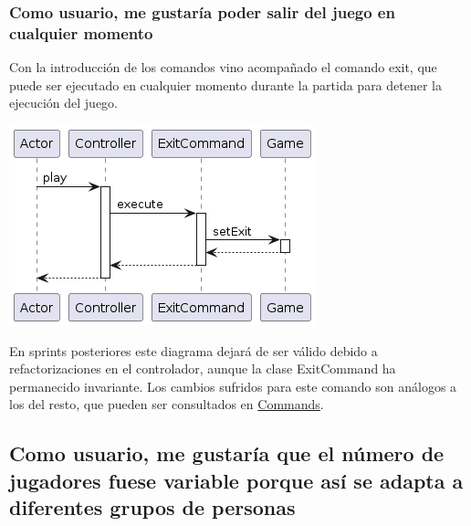 \documentclass[../DocumentoOficial.tex]{subfiles}
\begin{document}
\subsubsection{Como usuario, me gustaría poder salir del juego en cualquier momento}
\begin{sprint}[2]
Con la introducción de los comandos vino acompañado el comando exit, que puede ser ejecutado en cualquier momento durante la partida para detener la ejecución del juego.

\begin{center}
\includegraphics[scale=0.5]{exit-sprint2.png}
\end{center}

En sprints posteriores este diagrama dejará de ser válido debido a refactorizaciones en el controlador, aunque la clase ExitCommand ha permanecido invariante. Los cambios sufridos para este comando son análogos a los del resto, que pueden ser consultados en \hyperref[subsec:Commands]{Commands}.
\end{sprint}

\subsection{Como usuario, me gustaría que el número de jugadores fuese variable porque así se adapta a diferentes grupos de personas}
\end{document}
